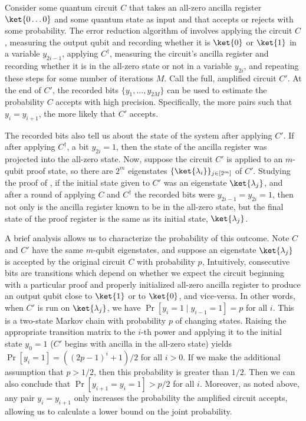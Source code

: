 Consider some quantum circuit $C$ that takes an all-zero ancilla register $\ket{0\dots 0}$ and some quantum state as input
and that accepts or rejects with some probability.
The error reduction algorithm of \cite{marriott2005quantum} involves
applying the circuit $C$,
measuring the output qubit and
recording whether it is $\ket{0}$ or $\ket{1}$ in a variable $y_{2i-1}$,
applying $C^{\dagger}$, 
measuring the circuit's ancilla register and
recording whether it is
in the all-zero
state or not in a variable $y_{2i}$, and repeating these steps for some number of
iterations $M$.
Call the full, amplified circuit $C'$.
At the end of $C'$, the recorded bits $\{y_1,\dots,y_{2M}\}$ can be used to estimate the probability $C$ accepts
with high precision. 
Specifically, the more pairs such that $y_i = y_{i+1}$, the more likely that $C'$ accepts.

The recorded bits also tell us about the state of the system after applying $C'$.
If after applying $C^\dagger$, a bit $y_{2i}=1$,
then the state of the ancilla register was projected into the all-zero state.
Now, suppose the circuit $C'$ is applied to an $m$-qubit proof state,
so there are $2^m$ eigenstates $\{\ket{\lambda_i}\}_{j\in [2^m]}$ of $C'$.
Studying the proof of \cite{marriott2005quantum},
if the initial state given to $C'$ was an eigenstate $\ket{\lambda_j}$,
and after a round of applying $C$ and $C^\dagger$ the recorded bits were $y_{2i-1}=y_{2i}=1$,
then not only is the ancilla register known to be in the all-zero state,
but the final state of the proof register is the same as its initial state,
$\ket{\lambda_j}$.

A brief analysis allows us to characterize the probability of this outcome.
Note $C$ and $C'$ have the same $m$-qubit eigenstates,
and suppose an eigenstate $\ket{\lambda_j}$ is accepted by the
original circuit $C$ with probability $p$,
Intuitively, consecutive bits are transitions which depend on whether we expect
the circuit beginning with a particular proof and properly initialized all-zero ancilla register to produce an output qubit close to $\ket{1}$ or to $\ket{0}$, and vice-versa.
In other words, when $C'$ is run on $\ket{\lambda_j}$,
we have $\Pr\left[y_{i}=1 \mid y_{i-1}=1\right] = p$ for all $i$.
This is a two-state Markov chain
with probability $p$ of changing states.
Raising the appropriate transition matrix to the $i$-th power
and applying it to the initial state $y_0=1$ ($C'$ begins with ancilla in the all-zero state) 
yields $\Pr\left[y_i=1\right] = \left(\left(2p-1\right)^i + 1\right)/2$ for all $i>0$.
If we make the additional assumption that $p>1/2$, then this probability is greater than $1/2$.
Then we can also conclude that $\Pr\left[y_{i+1}=y_i=1\right] > p/2$ for all $i$.
Moreover, as noted above,
any pair $y_{i}=y_{i+1}$ only increases the probability the amplified circuit accepts, allowing us to %
calculate a lower bound on the joint probability. %


